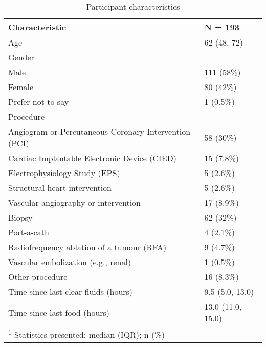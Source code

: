 \documentclass[12pt,twoside,]{pinp}
\begin{document}
\begin{table}

\caption{\label{tab:tab1pdf}Participant characteristics}
\centering
\begin{tabular}[t]{ll}
\toprule
Characteristic & N = 193\\
\midrule
Age & 62 (48, 72)\\
Gender & \\
\hspace{1em}Male & 111 (58\%)\\
\hspace{1em}Female & 80 (42\%)\\
\hspace{1em}Prefer not to say & 1 (0.5\%)\\
\addlinespace
Procedure & \\
\hspace{1em}Angiogram or Percutaneous Coronary Intervention (PCI) & 58 (30\%)\\
\hspace{1em}Cardiac Implantable Electronic Device (CIED) & 15 (7.8\%)\\
\hspace{1em}Electrophysiology Study (EPS) & 5 (2.6\%)\\
\hspace{1em}Structural heart intervention & 5 (2.6\%)\\
\addlinespace
\hspace{1em}Vascular angiography or intervention & 17 (8.9\%)\\
\hspace{1em}Biopsy & 62 (32\%)\\
\hspace{1em}Port-a-cath & 4 (2.1\%)\\
\hspace{1em}Radiofrequency ablation of a tumour (RFA) & 9 (4.7\%)\\
\hspace{1em}Vascular embolization (e.g., renal) & 1 (0.5\%)\\
\addlinespace
\hspace{1em}Other procedure & 16 (8.3\%)\\
Time since last clear fluids (hours) & 9.5 (5.0, 13.0)\\
Time since last food (hours) & 13.0 (11.0, 15.0)\\
\bottomrule
\multicolumn{2}{l}{\textsuperscript{1} Statistics presented: median (IQR); n (\%)}\\
\end{tabular}
\end{table}
\end{document}
